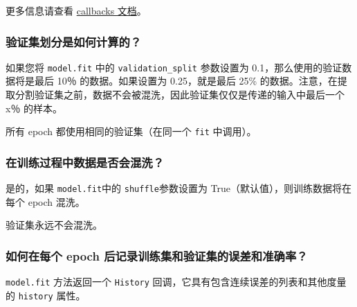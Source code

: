 \begin{Shaded}
\begin{Highlighting}[]
  
\OperatorTok{=} \OperatorTok{=}\OperatorTok{=}\NormalTok{)}
\OperatorTok{=}\OperatorTok{=}
\end{Highlighting}
\end{Shaded}

更多信息请查看 \hyperref[callbacks]{callbacks 文档}。



\subsubsection{验证集划分是如何计算的？}\label{how-is-the-validation-split-computed}

如果您将 \texttt{model.fit} 中的 \texttt{validation\_split} 参数设置为
0.1，那么使用的验证数据将是最后 10％ 的数据。如果设置为 0.25，就是最后
25\%
的数据。注意，在提取分割验证集之前，数据不会被混洗，因此验证集仅仅是传递的输入中最后一个
x％ 的样本。

所有 epoch 都使用相同的验证集（在同一个 \texttt{fit} 中调用）。



\subsubsection{在训练过程中数据是否会混洗？}\label{is-the-data-shuffled-during-training}

是的，如果 \texttt{model.fit}中的 \texttt{shuffle}参数设置为
True（默认值），则训练数据将在每个 epoch 混洗。

验证集永远不会混洗。



\subsubsection{如何在每个 epoch
后记录训练集和验证集的误差和准确率？}\label{how-can-i-record-the-training-validation-loss-accuracy-at-each-epoch}

\texttt{model.fit} 方法返回一个 \texttt{History}
回调，它具有包含连续误差的列表和其他度量的 \texttt{history} 属性。

\begin{Shaded}
\begin{Highlighting}[]
\OperatorTok{=} \OperatorTok{=}\NormalTok{)}
\end{Highlighting}
\end{Shaded}



